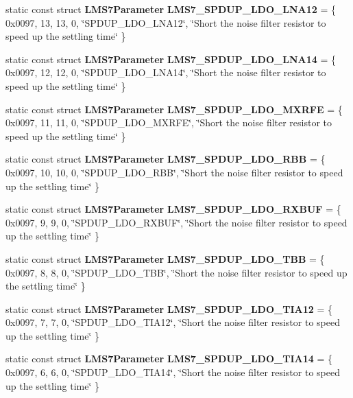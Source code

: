 \begin{DoxyCompactItemize}
\item 
static const struct {\bf L\+M\+S7\+Parameter} {\bf L\+M\+S7\+\_\+\+S\+P\+D\+U\+P\+\_\+\+L\+D\+O\+\_\+\+L\+N\+A12} = \{ 0x0097, 13, 13, 0, \char`\"{}\+S\+P\+D\+U\+P\+\_\+\+L\+D\+O\+\_\+\+L\+N\+A12\char`\"{}, \char`\"{}\+Short the noise filter resistor to speed up the settling time\char`\"{} \}
\item 
static const struct {\bf L\+M\+S7\+Parameter} {\bf L\+M\+S7\+\_\+\+S\+P\+D\+U\+P\+\_\+\+L\+D\+O\+\_\+\+L\+N\+A14} = \{ 0x0097, 12, 12, 0, \char`\"{}\+S\+P\+D\+U\+P\+\_\+\+L\+D\+O\+\_\+\+L\+N\+A14\char`\"{}, \char`\"{}\+Short the noise filter resistor to speed up the settling time\char`\"{} \}
\item 
static const struct {\bf L\+M\+S7\+Parameter} {\bf L\+M\+S7\+\_\+\+S\+P\+D\+U\+P\+\_\+\+L\+D\+O\+\_\+\+M\+X\+R\+FE} = \{ 0x0097, 11, 11, 0, \char`\"{}\+S\+P\+D\+U\+P\+\_\+\+L\+D\+O\+\_\+\+M\+X\+R\+F\+E\char`\"{}, \char`\"{}\+Short the noise filter resistor to speed up the settling time\char`\"{} \}
\item 
static const struct {\bf L\+M\+S7\+Parameter} {\bf L\+M\+S7\+\_\+\+S\+P\+D\+U\+P\+\_\+\+L\+D\+O\+\_\+\+R\+BB} = \{ 0x0097, 10, 10, 0, \char`\"{}\+S\+P\+D\+U\+P\+\_\+\+L\+D\+O\+\_\+\+R\+B\+B\char`\"{}, \char`\"{}\+Short the noise filter resistor to speed up the settling time\char`\"{} \}
\item 
static const struct {\bf L\+M\+S7\+Parameter} {\bf L\+M\+S7\+\_\+\+S\+P\+D\+U\+P\+\_\+\+L\+D\+O\+\_\+\+R\+X\+B\+UF} = \{ 0x0097, 9, 9, 0, \char`\"{}\+S\+P\+D\+U\+P\+\_\+\+L\+D\+O\+\_\+\+R\+X\+B\+U\+F\char`\"{}, \char`\"{}\+Short the noise filter resistor to speed up the settling time\char`\"{} \}
\item 
static const struct {\bf L\+M\+S7\+Parameter} {\bf L\+M\+S7\+\_\+\+S\+P\+D\+U\+P\+\_\+\+L\+D\+O\+\_\+\+T\+BB} = \{ 0x0097, 8, 8, 0, \char`\"{}\+S\+P\+D\+U\+P\+\_\+\+L\+D\+O\+\_\+\+T\+B\+B\char`\"{}, \char`\"{}\+Short the noise filter resistor to speed up the settling time\char`\"{} \}
\item 
static const struct {\bf L\+M\+S7\+Parameter} {\bf L\+M\+S7\+\_\+\+S\+P\+D\+U\+P\+\_\+\+L\+D\+O\+\_\+\+T\+I\+A12} = \{ 0x0097, 7, 7, 0, \char`\"{}\+S\+P\+D\+U\+P\+\_\+\+L\+D\+O\+\_\+\+T\+I\+A12\char`\"{}, \char`\"{}\+Short the noise filter resistor to speed up the settling time\char`\"{} \}
\item 
static const struct {\bf L\+M\+S7\+Parameter} {\bf L\+M\+S7\+\_\+\+S\+P\+D\+U\+P\+\_\+\+L\+D\+O\+\_\+\+T\+I\+A14} = \{ 0x0097, 6, 6, 0, \char`\"{}\+S\+P\+D\+U\+P\+\_\+\+L\+D\+O\+\_\+\+T\+I\+A14\char`\"{}, \char`\"{}\+Short the noise filter resistor to speed up the settling time\char`\"{} \}

\end{DoxyCompactItemize}
